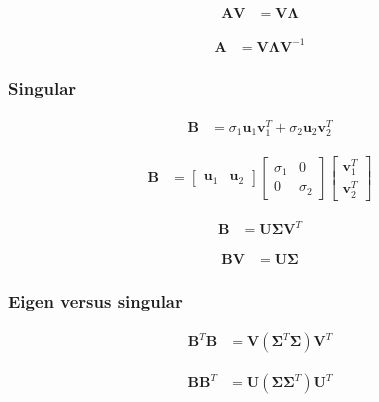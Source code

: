 \documentclass{article}
\begin{document}
\begin{align}
	\mathbf{A}\mathbf{V} & =\mathbf{V}\mathbf{\Lambda}
\end{align}

\begin{align}
	\mathbf{A} & =\mathbf{V}\mathbf{\Lambda}\mathbf{V}^{-1}
\end{align}

\subsubsection{Singular}

\begin{align}
	\mathbf{B} & =\sigma_{1}\mathbf{u}_{1}\mathbf{v}_{1}^{T}+\sigma_{2}\mathbf{u}_{2}\mathbf{v}_{2}^{T}
\end{align}

\begin{align}
	\mathbf{B} & =\left[\begin{array}{cc}
		\mathbf{u}_{1} & \mathbf{u}_{2}\end{array}\right]\left[\begin{array}{cc}
		\sigma_{1} & 0\\
		0 & \sigma_{2}
	\end{array}\right]\left[\begin{array}{c}
		\mathbf{v}_{1}^{T}\\
		\mathbf{v}_{2}^{T}
	\end{array}\right]
\end{align}

\begin{align}
	\mathbf{B} & =\mathbf{U}\mathbf{\Sigma}\mathbf{V}^{T}
\end{align}

\begin{align}
	\mathbf{B}\mathbf{V} & =\mathbf{U}\mathbf{\Sigma}
\end{align}

\subsubsection{Eigen versus singular}

\begin{align}
	\mathbf{B}^{T}\mathbf{B} & =\mathbf{V}\left(\mathbf{\Sigma}^{T}\mathbf{\Sigma}\right)\mathbf{V}^{T}
\end{align}

\begin{align}
	\mathbf{B}\mathbf{B}^{T} & =\mathbf{U}\left(\mathbf{\Sigma}\mathbf{\Sigma}^{T}\right)\mathbf{U}^{T}
\end{align}

\subsection{}



\end{document}
